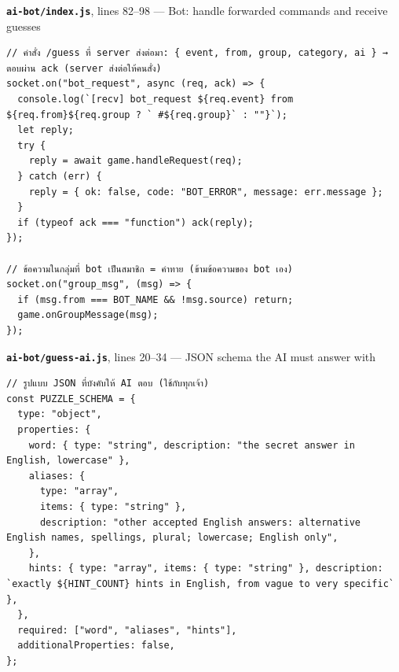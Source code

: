\documentclass[11pt,a4paper]{article}
\newcommand{\code}[1]{\texttt{#1}}
\newcommand{\snap}[3]{\par\medskip\textbf{\code{#1}}, lines #2 --- #3}
\begin{document}
\snap{ai-bot/index.js}{82--98}{Bot: handle forwarded commands and receive guesses}
\begin{Verbatim}[firstnumber=82]
// คำสั่ง /guess ที่ server ส่งต่อมา: { event, from, group, category, ai } → ตอบผ่าน ack (server ส่งต่อให้คนสั่ง)
socket.on("bot_request", async (req, ack) => {
  console.log(`[recv] bot_request ${req.event} from ${req.from}${req.group ? ` #${req.group}` : ""}`);
  let reply;
  try {
    reply = await game.handleRequest(req);
  } catch (err) {
    reply = { ok: false, code: "BOT_ERROR", message: err.message };
  }
  if (typeof ack === "function") ack(reply);
});

// ข้อความในกลุ่มที่ bot เป็นสมาชิก = คำทาย (ข้ามข้อความของ bot เอง)
socket.on("group_msg", (msg) => {
  if (msg.from === BOT_NAME && !msg.source) return;
  game.onGroupMessage(msg);
});
\end{Verbatim}

\snap{ai-bot/guess-ai.js}{20--34}{JSON schema the AI must answer with}
\begin{Verbatim}[firstnumber=20]
// รูปแบบ JSON ที่บังคับให้ AI ตอบ (ใช้กับทุกเจ้า)
const PUZZLE_SCHEMA = {
  type: "object",
  properties: {
    word: { type: "string", description: "the secret answer in English, lowercase" },
    aliases: {
      type: "array",
      items: { type: "string" },
      description: "other accepted English answers: alternative English names, spellings, plural; lowercase; English only",
    },
    hints: { type: "array", items: { type: "string" }, description: `exactly ${HINT_COUNT} hints in English, from vague to very specific` },
  },
  required: ["word", "aliases", "hints"],
  additionalProperties: false,
};
\end{Verbatim}
\end{document}

